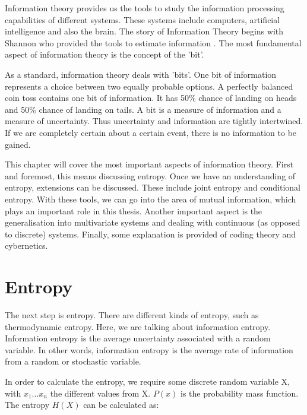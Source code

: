 Information theory provides us the tools to study the information processing capabilities of different systems. These systems include computers, artificial intelligence and also the brain. The story of Information Theory begins with Shannon who provided the tools to estimate information \cite{shin1949mathematical}. The most fundamental aspect of information theory is the concept of the 'bit'. 

As a standard, information theory deals with 'bits'. One bit of information represents a choice between two equally probable options. A perfectly balanced coin toss contains one bit of information. It has 50\% chance of landing on heads and 50\% chance of landing on tails. A bit is a measure of information and a measure of uncertainty. Thus uncertainty and information are tightly intertwined. If we are completely certain about a certain event, there is no information to be gained. \cite{kannathal2005entropies}

This chapter will cover the most important aspects of information theory. First and foremost, this means discussing entropy. Once we have an understanding of entropy, extensions can be discussed. These include joint entropy and conditional entropy. With these tools, we can go into the area of mutual information, which plays an important role in this thesis. Another important aspect is the generalisation into multivariate systems and dealing with continuous (as opposed to discrete) systems. Finally, some explanation is provided of coding theory and cybernetics.

\section{Entropy}

The next step is entropy. There are different kinds of entropy, such as thermodynamic entropy. Here, we are talking about information entropy. Information entropy is the average uncertainty associated with a random variable. In other words, information entropy is the average rate of information from a random or stochastic variable. 

In order to calculate the entropy, we require some discrete random variable X, with ${x_1 ... x_n}$ the different values from X. $P(x)$ is the probability mass function. The entropy $H(X)$ can be calculated as:

